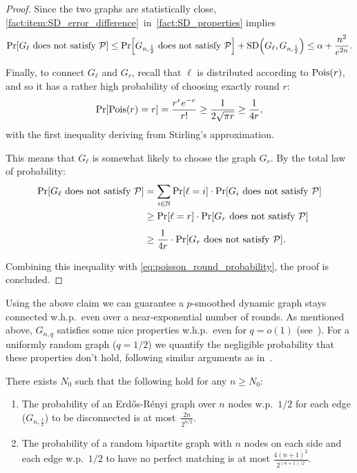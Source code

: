 \documentclass[letter,11pt]{article}
\newcommand{\er}{Erd\H{o}s-R\'{e}nyi\xspace}
\begin{document}
\begin{proof}
    Since the two graphs are statistically close,  \cref{fact:item:SD_error_difference}~in~\cref{fact:SD_properties} implies
    \begin{equation}
        \label{eq:poisson_round_probability}
        \Prob{}{G_{\ell} \textnormal{ does not satisfy } \mathcal{P}} 
        \leq \Prob{}{G_{n,\frac{1}{2}} \textnormal{ does not satisfy } \mathcal{P}} + \sd{G_{\ell}}{G_{n,\frac{1}{2}}}
        \leq \alpha + \frac{n^2}{e^{2n}} .
    \end{equation}
        

    Finally, to connect $G_{\ell}$ and $G_r$, recall that $\ell$ is distributed according to $\poisson{r}$, and so it has a rather high probability of choosing exactly round $r$:
    \[
        \Prob{}{\poisson{r} = r} = \frac{r^re^{-r}}{r!} 
        \geq \frac{1}{2\sqrt{\pi r}}
        \geq \frac{1}{4r} ,
    \]
    with the first inequality deriving from Stirling's approximation.

    This means that $G_{\ell}$ is somewhat likely to choose the graph $G_r$. By the total law of probability:
    \[
    \begin{aligned}
        \Prob{}{G_{\ell} \textnormal{ does not satisfy } \mathcal{P}} 
        &= \sum_{i\in\N} \Prob{}{\ell = i} \cdot \Prob{}{G_{i} \textnormal{ does not satisfy } \mathcal{P}} \\ 
        &\geq \Prob{}{\ell = r} \cdot \Prob{}{G_{r} \textnormal{ does not satisfy } \mathcal{P}}\\
        &\geq \frac{1}{4r} \cdot \Prob{}{G_{r} \textnormal{ does not satisfy } \mathcal{P}} .
    \end{aligned}
    \]
        
    Combining this inequality with \cref{eq:poisson_round_probability}, the proof is concluded.    
\end{proof}


Using the above claim we can guarantee a $p$-smoothed dynamic graph stays connected w.h.p.\ even over a near-exponential number of rounds.
As mentioned above, $G_{n,q}$ satisfies some nice properties w.h.p.\ even for $q = o(1)$ (see~\cite{books:random_graphs_janson2011}).
For a uniformly random graph ($q=1/2$) we quantify the negligible probability that these properties don't hold, following similar arguments as in~\cite{ER59,ER64}.


\begin{claim}
    \label{claim:negligible_probabilities}
    There exists $N_0$ such that the following hold for any $n \geq N_0$: 
    \begin{enumerate}
        \item The probability of an \er graph over $n$ nodes w.p.~$1/2$ for each edge ($G_{n,\frac 1 2}$) to be disconnected is at most~$\frac{2n}{2^{n/2}}$.

        \item The probability of a random bipartite graph with $n$ nodes on each side and each edge w.p.~$1/2$ to have no perfect matching is at most $\frac{4(n+1)^2}{2^{(n+1)/2}}$.
    \end{enumerate}
\end{claim}
\end{document}
